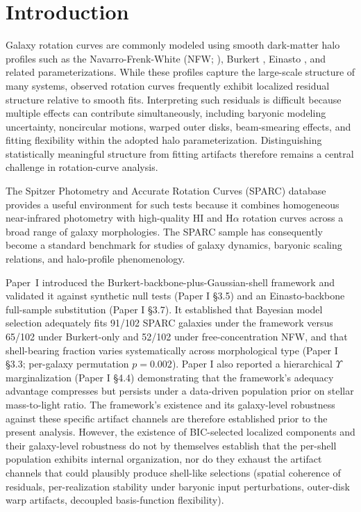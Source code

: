 \documentclass[linenumbers,trackchanges]{aastex701}
\begin{document}

\section{Introduction}

Galaxy rotation curves are commonly modeled using smooth dark-matter halo profiles such as the Navarro-Frenk-White (NFW; \citealt{NFW1997}), Burkert \citep{Burkert1995}, Einasto \citep{Navarro2004}, and related parameterizations. While these profiles capture the large-scale structure of many systems, observed rotation curves frequently exhibit localized residual structure relative to smooth fits. Interpreting such residuals is difficult because multiple effects can contribute simultaneously, including baryonic modeling uncertainty, noncircular motions, warped outer disks, beam-smearing effects, and fitting flexibility within the adopted halo parameterization. Distinguishing statistically meaningful structure from fitting artifacts therefore remains a central challenge in rotation-curve analysis.

The Spitzer Photometry and Accurate Rotation Curves (SPARC) database \citet{Lelli2016} provides a useful environment for such tests because it combines homogeneous near-infrared photometry with high-quality HI and H$\alpha$ rotation curves across a broad range of galaxy morphologies. The SPARC sample has consequently become a standard benchmark for studies of galaxy dynamics, baryonic scaling relations, and halo-profile phenomenology.

Paper~I \citep{Bibb2026} introduced the Burkert-backbone-plus-Gaussian-shell framework and validated it against synthetic null tests (Paper I \S3.5) and an Einasto-backbone full-sample substitution (Paper I \S3.7). It established that Bayesian model selection adequately fits 91/102 SPARC galaxies under the framework versus 65/102 under Burkert-only and 52/102 under free-concentration NFW, and that shell-bearing fraction varies systematically across morphological type (Paper I \S3.3; per-galaxy permutation $p = 0.002$). Paper I also reported a hierarchical $\Upsilon$ marginalization (Paper I \S4.4) demonstrating that the framework's adequacy advantage compresses but persists under a data-driven population prior on stellar mass-to-light ratio. The framework's existence and its galaxy-level robustness against these specific artifact channels are therefore established prior to the present analysis. However, the existence of BIC-selected localized components and their galaxy-level robustness do not by themselves establish that the per-shell population exhibits internal organization, nor do they exhaust the artifact channels that could plausibly produce shell-like selections (spatial coherence of residuals, per-realization stability under baryonic input perturbations, outer-disk warp artifacts, decoupled basis-function flexibility).
\end{document}

